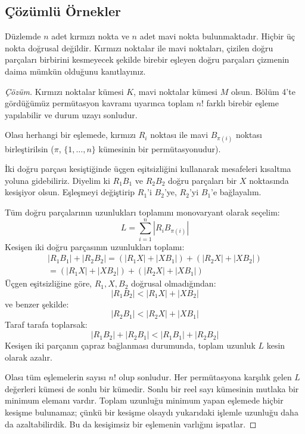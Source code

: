 \subsection{Çözümlü Örnekler}

\begin{example}
Düzlemde $n$ adet kırmızı nokta ve $n$ adet mavi nokta bulunmaktadır. Hiçbir üç nokta doğrusal değildir. Kırmızı noktalar ile mavi noktaları, çizilen doğru parçaları birbirini kesmeyecek şekilde birebir eşleyen doğru parçaları çizmenin daima mümkün olduğunu kanıtlayınız.
\end{example}

\begin{proof}[Çözüm]
Kırmızı noktalar kümesi $K$, mavi noktalar kümesi $M$ olsun. Bölüm 4'te gördüğümüz permütasyon kavramı uyarınca toplam $n!$ farklı birebir eşleme yapılabilir ve durum uzayı sonludur.

Olası herhangi bir eşlemede, kırmızı $R_i$ noktası ile mavi $B_{\pi(i)}$ noktası birleştirilsin ($\pi$, $\{1, \dots, n\}$ kümesinin bir permütasyonudur). 

İki doğru parçası kesiştiğinde üçgen eşitsizliğini kullanarak mesafeleri kısaltma yoluna gidebiliriz. Diyelim ki $R_1 B_1$ ve $R_2 B_2$ doğru parçaları bir $X$ noktasında kesişiyor olsun. Eşleşmeyi değiştirip $R_1$'i $B_2$'ye, $R_2$'yi $B_1$'e bağlayalım.

Tüm doğru parçalarının uzunlukları toplamını monovaryant olarak seçelim:
\[
L = \sum_{i=1}^n |R_i B_{\pi(i)}|
\]
Kesişen iki doğru parçasının uzunlukları toplamı:
\begin{multline*}
|R_1 B_1| + |R_2 B_2| = (|R_1 X| + |X B_1|) + (|R_2 X| + |X B_2|) \\
= (|R_1 X| + |X B_2|) + (|R_2 X| + |X B_1|)
\end{multline*}
Üçgen eşitsizliğine göre, $R_1, X, B_2$ doğrusal olmadığından:
\[
|R_1 B_2| < |R_1 X| + |X B_2|
\]
ve benzer şekilde:
\[
|R_2 B_1| < |R_2 X| + |X B_1|
\]
Taraf tarafa toplarsak:
\[
|R_1 B_2| + |R_2 B_1| < |R_1 B_1| + |R_2 B_2|
\]
Kesişen iki parçanın çapraz bağlanması durumunda, toplam uzunluk $L$ kesin olarak azalır.

Olası tüm eşlemelerin sayısı $n!$ olup sonludur. Her permütasyona karşılık gelen $L$ değerleri kümesi de sonlu bir kümedir. Sonlu bir reel sayı kümesinin mutlaka bir minimum elemanı vardır. Toplam uzunluğu minimum yapan eşlemede hiçbir kesişme bulunamaz; çünkü bir kesişme olsaydı yukarıdaki işlemle uzunluğu daha da azaltabilirdik. Bu da kesişimsiz bir eşlemenin varlığını ispatlar.
\end{proof}

